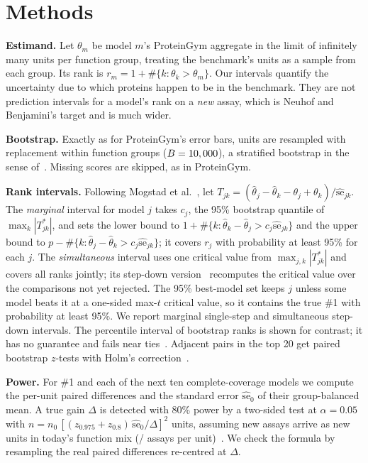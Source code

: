 \documentclass[9pt,twocolumn]{extarticle}
\begin{document}
\section{Methods}
\textbf{Estimand.} Let $\theta_m$ be model $m$'s ProteinGym aggregate in the limit of infinitely many units per
function group, treating the benchmark's units as a sample from each group. Its rank is
$r_m = 1 + \#\{k:\theta_k>\theta_m\}$. Our intervals quantify the uncertainty due to which proteins happen to be in
the benchmark. They are not prediction intervals for a model's rank on a \emph{new} assay, which is Neuhof and
Benjamini's target and is much wider.

\textbf{Bootstrap.} Exactly as for ProteinGym's error bars, units are resampled with replacement within function
groups ($B=10,000$), a stratified bootstrap in the sense of~\cite{agarwal2021deep}. Missing scores are skipped, as in
ProteinGym.

\textbf{Rank intervals.} Following Mogstad et al.~\cite{mogstad2024inference}, let
$T_{jk}=(\hat\theta_j-\hat\theta_k-\theta_j+\theta_k)/\widehat{\mathrm{se}}_{jk}$. The \emph{marginal} interval
for model $j$ takes $c_j$, the 95\% bootstrap quantile of $\max_k|T^*_{jk}|$, and sets the lower bound to
$1+\#\{k:\hat\theta_k-\hat\theta_j>c_j\widehat{\mathrm{se}}_{jk}\}$ and the upper bound to
$p-\#\{k:\hat\theta_j-\hat\theta_k>c_j\widehat{\mathrm{se}}_{jk}\}$; it covers $r_j$ with probability at least 95\%
for each $j$. The \emph{simultaneous} interval uses one critical value from $\max_{j,k}|T^*_{jk}|$ and covers all
ranks jointly; its step-down version~\cite{romano2005exact} recomputes the critical value over the comparisons not
yet rejected. The 95\% best-model set keeps $j$ unless some model beats it at a one-sided max-$t$ critical value, so
it contains the true \#1 with probability at least 95\%. We report marginal single-step and simultaneous step-down
intervals. The percentile interval of bootstrap ranks is shown for contrast; it has no guarantee and fails near
ties~\cite{hall2009bootstrap,almohamad2022simultaneous}. Adjacent pairs in the top 20 get paired bootstrap $z$-tests
with Holm's correction~\cite{holm1979simple}.

\textbf{Power.} For \#1 and each of the next ten complete-coverage models we compute the per-unit paired
differences and the standard error $\widehat{\mathrm{se}}_0$ of their group-balanced mean. A true gain $\Delta$ is
detected with 80\% power by a two-sided test at $\alpha=0.05$ with
$n=n_0\,[(z_{0.975}+z_{0.8})\,\widehat{\mathrm{se}}_0/\Delta]^2$ units, assuming new assays arrive as new units in
today's function mix (\nAssays/\nUnits{} assays per unit)~\cite{card2020little,miller2024adding}. We check the
formula by resampling the real paired differences re-centred at $\Delta$.
\end{document}
